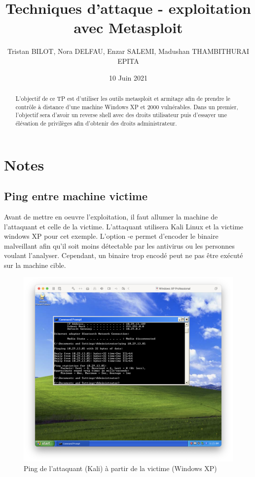 \documentclass[12pt, oneside]{article}
\begin{document}
\title{Techniques d'attaque - exploitation avec Metasploit}
\author{Tristan BILOT, Nora DELFAU, Enzar SALEMI, Madushan THAMBITHURAI\\EPITA}
\date{10 Juin 2021}
\maketitle

\begin{abstract}
L'objectif de ce TP est d'utiliser les outils metasploit et armitage afin de prendre le contrôle à distance d'une machine Windows XP et 2000 vulnérables. Dans un premier, l'objectif sera d'avoir un reverse shell avec des droits utilisateur puis d'essayer une élévation de privilèges afin d'obtenir des droits administrateur. 
\end{abstract}

\section{Notes}
\subsection{Ping entre machine victime}
Avant de mettre en oeuvre l'exploitation, il faut allumer la machine de l'attaquant et celle de la victime. L'attaquant utilisera Kali Linux et la victime windows XP pour cet exemple.
L'option -e permet d'encoder le binaire malveillant afin qu'il soit moins détectable par les antivirus ou les personnes voulant l'analyser. Cependant, un binaire trop encodé peut ne pas être exécuté sur la machine cible.
\begin{figure}[H]
\centering
\includegraphics[scale=0.4]{win}
\caption{Ping de l'attaquant (Kali) à partir de la victime (Windows XP)}
\end{figure}
\end{document}
